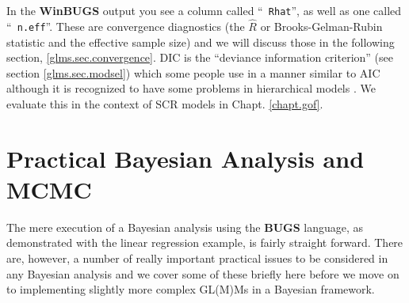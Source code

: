


 In the {\bf WinBUGS} output you see a column called ``\mbox{\tt
   Rhat}'', as well as one called ``\mbox{\tt
   n.eff}''. These are convergence diagnostics (the $\hat{R}$ or Brooks-Gelman-Rubin statistic and the effective sample size) and we will discuss those in the following section, \ref{glms.sec.convergence}. DIC is the
``deviance information criterion'' \citep{spiegelhalter_etal:2002}
(see section \ref{glms.sec.modsel})
 which
some people use in a manner similar to AIC although it is recognized
to have some problems in hierarchical models \citep{millar:2009}. We
evaluate this in the context of SCR models in Chapt. \ref{chapt.gof}.





\section{Practical Bayesian Analysis and MCMC}
\label{GLMM.sec.practical}

The mere execution of a Bayesian analysis using the {\bf BUGS} language, as demonstrated with the linear regression example, is fairly straight forward. There are, however, a number of really important practical issues to be
considered in any Bayesian analysis and we cover some of these briefly
here before we move on to implementing slightly more complex GL(M)Ms in a Bayesian framework.

